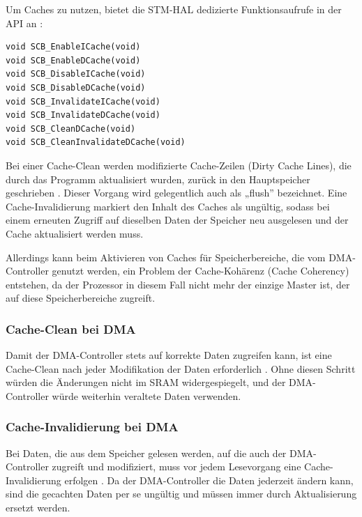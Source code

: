 Um Caches zu nutzen, bietet die STM-\ac{HAL} dedizierte Funktionsaufrufe in der
API an \cite[S. 4]{an4839}:

\begin{code}
\begin{verbatim}
void SCB_EnableICache(void)
void SCB_EnableDCache(void)
void SCB_DisableICache(void)
void SCB_DisableDCache(void)
void SCB_InvalidateICache(void)
void SCB_InvalidateDCache(void)
void SCB_CleanDCache(void)
void SCB_CleanInvalidateDCache(void)
\end{verbatim}
\end{code}

Bei einer Cache-Clean werden modifizierte Cache-Zeilen (Dirty Cache Lines), die
durch das Programm aktualisiert wurden, zurück in den Hauptspeicher geschrieben
\cite[S. 4]{an4839}. Dieser Vorgang wird gelegentlich auch als „flush”
bezeichnet. Eine Cache-Invalidierung markiert den Inhalt des Caches als
ungültig, sodass bei einem erneuten Zugriff auf dieselben Daten der Speicher neu
ausgelesen und der Cache aktualisiert werden muss.

Allerdings kann beim Aktivieren von Caches für Speicherbereiche, die vom
DMA-Controller genutzt werden, ein Problem der Cache-Kohärenz (Cache Coherency)
entstehen, da der Prozessor in diesem Fall nicht mehr der einzige Master ist,
der auf diese Speicherbereiche zugreift.

\subsubsection{Cache-Clean bei DMA} \label{sec:cache_clean}

Damit der DMA-Controller stets auf korrekte Daten zugreifen kann, ist eine
Cache-Clean nach jeder Modifikation der Daten erforderlich \cite[S. 6]{an4839}.
Ohne diesen Schritt würden die Änderungen nicht im SRAM widergespiegelt, und der
DMA-Controller würde weiterhin veraltete Daten verwenden.

\subsubsection{Cache-Invalidierung bei DMA}

Bei Daten, die aus dem Speicher gelesen werden, auf die auch der DMA-Controller
zugreift und modifiziert, muss vor jedem Lesevorgang eine Cache-Invalidierung
erfolgen \cite{embeddedexpert_cache}. Da der DMA-Controller die Daten jederzeit
ändern kann, sind die gecachten Daten per se ungültig und müssen immer durch
Aktualisierung ersetzt werden.

